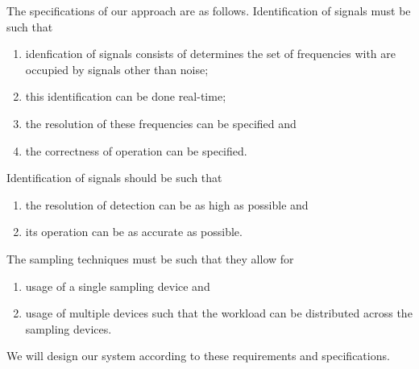 \documentclass[a4paper, openany, oneside]{memoir}
\begin{document}
The specifications of our approach are as follows. Identification of signals must be such that
\begin{enumerate}
    \item idenfication of signals consists of determines the set of frequencies with are occupied by signals other than noise;
    \item this identification can be done real-time;
    \item the resolution of these frequencies can be specified and
    \item the correctness of operation can be specified.
\end{enumerate}
Identification of signals should be such that
\begin{enumerate}
    \item the resolution of detection can be as high as possible and
    \item its operation can be as accurate as possible.
\end{enumerate}

The sampling techniques must be such that they allow for
\begin{enumerate}
    \item usage of a single sampling device and
    \item usage of multiple devices such that the workload can be distributed across the sampling devices.
\end{enumerate}

We will design our system according to these requirements and specifications.












\end{document}

